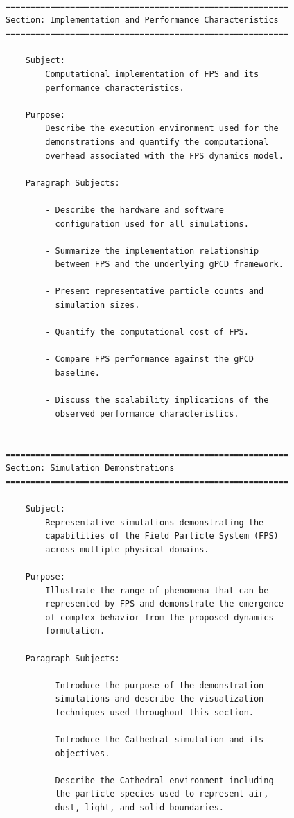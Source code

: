 \begin{verbatim}
=========================================================
Section: Implementation and Performance Characteristics
=========================================================

    Subject:
        Computational implementation of FPS and its
        performance characteristics.

    Purpose:
        Describe the execution environment used for the
        demonstrations and quantify the computational
        overhead associated with the FPS dynamics model.

    Paragraph Subjects:

        - Describe the hardware and software
          configuration used for all simulations.

        - Summarize the implementation relationship
          between FPS and the underlying gPCD framework.

        - Present representative particle counts and
          simulation sizes.

        - Quantify the computational cost of FPS.

        - Compare FPS performance against the gPCD
          baseline.

        - Discuss the scalability implications of the
          observed performance characteristics.


=========================================================
Section: Simulation Demonstrations
=========================================================

    Subject:
        Representative simulations demonstrating the
        capabilities of the Field Particle System (FPS)
        across multiple physical domains.

    Purpose:
        Illustrate the range of phenomena that can be
        represented by FPS and demonstrate the emergence
        of complex behavior from the proposed dynamics
        formulation.

    Paragraph Subjects:

        - Introduce the purpose of the demonstration
          simulations and describe the visualization
          techniques used throughout this section.

        - Introduce the Cathedral simulation and its
          objectives.

        - Describe the Cathedral environment including
          the particle species used to represent air,
          dust, light, and solid boundaries.


\end{verbatim}
